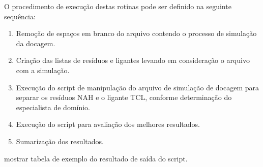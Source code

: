 O procedimento de execução destas rotinas pode ser definido na seguinte sequência:

\begin{enumerate}
    \item Remoção de espaços em branco do arquivo contendo o processo de simulação da docagem. 
    \item Criação das listas de resíduos e ligantes levando em consideração o arquivo com a simulação.
    \item Execução do script de manipulação do arquivo de simulação de docagem para separar os resíduos NAH e o ligante TCL, conforme determinação do especialista de domínio.
    \item Execução do script para avaliação dos melhores resultados.
    \item Sumarização dos resultados.
\end{enumerate}

mostrar tabela de exemplo do resultado de saída do script.
